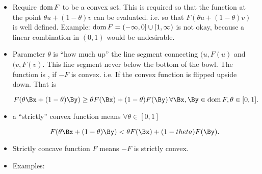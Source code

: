 \begin{itemize}
\item Require \( \operatorname{dom} F \) to be a convex set.  This is required so that the function at the point \( \theta u + (1-\theta) v \) can be evaluated.  i.e. so that \( F(\theta u + (1-\theta) v) \) is well defined.  Example: \( \operatorname{dom} F = (-\infty, 0] \cup [1, \infty) \) is not okay, because a linear combination in \( (0,1) \) would be undesirable.
\item Parameter \( \theta \) is ``how much up'' the line segment connecting \( (u, F(u) \) and \( (v, F(v) \).  This line segment never below the bottom of the bowl.
The function is , if \( -F \) is convex.
i.e. If the convex function is flipped upside down.  That is

\begin{equation}\label{eqn:convexOptimizationLecture5:360}
F(\theta \Bx + (1-\theta) \By ) \ge \theta F(\Bx) + (1-\theta) F(\By) \,\forall \Bx,\By \in \dom F, \theta \in [0,1].
\end{equation}
\item a ``strictly'' convex function means \(\forall \theta \in [0,1] \)

\begin{equation}\label{eqn:convexOptimizationLecture5:380}
F(\theta \Bx + (1-\theta) \By ) < \theta F(\Bx) + (1-theta) F(\By).
\end{equation}
\item Strictly concave function \( F \) means \( -F \) is strictly convex.
\item Examples:

\end{itemize}



